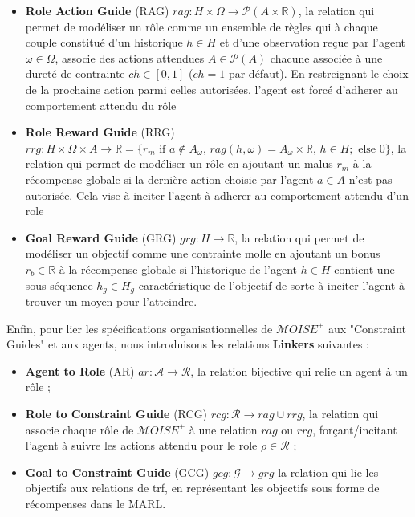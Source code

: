 \documentclass[sigconf,anonymous]{aamas}
\begin{document}
\begin{itemize}
    \item \textbf{Role Action Guide} (RAG) \quad $rag: H \times \Omega \rightarrow \mathcal{P}(A \times \mathbb{R})$, la relation qui permet de modéliser un rôle comme un ensemble de règles qui à chaque couple constitué d'un historique $h \in H$ et d'une observation reçue par l'agent $\omega \in \Omega$, associe des actions attendues $A \in \mathcal{P}(A)$ chacune associée à une dureté de contrainte $ch \in [0,1]$ ($ch = 1$ par défaut). En restreignant le choix de la prochaine action parmi celles autorisées, l'agent est forcé d'adherer au comportement attendu du rôle
    \item \textbf{Role Reward Guide} (RRG) \quad $rrg: H \times \Omega \times A \to \mathbb{R} = \{r_m \text{ if } a \notin A_\omega \text{, } rag(h, \omega) = A_\omega \times \mathbb{R} \text{, } h \in H; \text{ else } 0\}$, la relation qui permet de modéliser un rôle en ajoutant un malus $r_m$ à la récompense globale si la dernière action choisie par l'agent $a \in A$ n'est pas autorisée. Cela vise à inciter l'agent à adherer au comportement attendu d'un role
    \item \textbf{Goal Reward Guide} (GRG) \quad $grg: H \rightarrow \mathbb{R}$, la relation qui permet de modéliser un objectif comme une contrainte molle en ajoutant un bonus $r_b \in \mathbb{R}$ à la récompense globale si l'historique de l'agent $h \in H$ contient une sous-séquence $h_g \in H_g$ caractéristique de l'objectif de sorte à inciter l'agent à trouver un moyen pour l'atteindre.
\end{itemize}

Enfin, pour lier les spécifications organisationnelles de $\mathcal{M}OISE^+$ aux "Constraint Guides" et aux agents, nous introduisons les relations \textbf{Linkers} suivantes :
\begin{itemize}
    \item \textbf{Agent to Role} (AR) \quad $ar: \mathcal{A} \to \mathcal{R}$, la relation bijective qui relie un agent à un rôle ;
    \item \textbf{Role to Constraint Guide} (RCG) \quad $rcg: \mathcal{R} \rightarrow rag \cup rrg$, la relation qui associe chaque rôle de $\mathcal{M}OISE^+$ à une relation $rag$ ou $rrg$, forçant/incitant l'agent à suivre les actions attendu pour le role $\rho \in \mathcal{R}$ ;
    \item \textbf{Goal to Constraint Guide} (GCG) \quad $gcg: \mathcal{G} \rightarrow grg$ la relation qui lie les objectifs aux relations de trf, en représentant les objectifs sous forme de récompenses dans le MARL.
\end{itemize}
\end{document}
